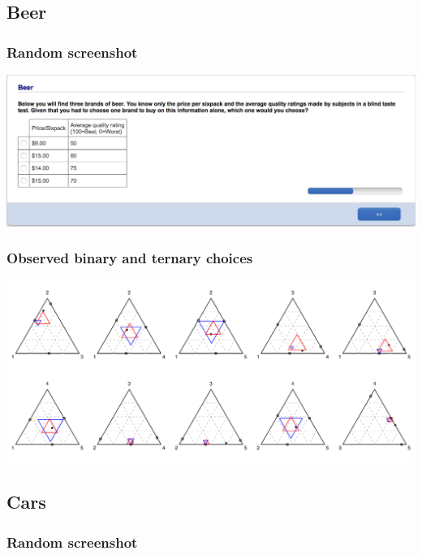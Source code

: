 \documentclass[11pt,letter]{article}
\begin{document}
\pagebreak

\subsection{Beer}



\subsubsection*{Random screenshot}

\includegraphics[width=15cm]{Population_study_design/screenshot_Beer.png}

\subsubsection*{Observed binary and ternary choices}

\includegraphics[width=15cm]{./Population_study_data/Simplexes/Beer.pdf}

\pagebreak

\subsection{Cars}



\subsubsection*{Random screenshot}
\end{document}
